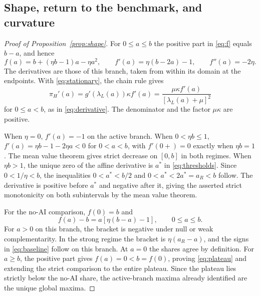 \documentclass[11pt]{article}
\theoremstyle{definition}
\newcommand{\lam}{\lambda_L}
\newcommand{\share}{\pi_H}
\newcommand{\peak}{a^*}
\newcommand{\ret}{a_R}
\begin{document}
\subsection{Shape, return to the benchmark, and curvature}\label{app:shape}
\begin{proof}[Proof of Proposition~\ref{prop:shape}]
For $0\leq a\leq b$ the positive part in \eqref{eq:f} equals $b-a$, and
hence
\begin{equation}\label{eq:quadratic}
 f(a)=b+(\eta b-1)a-\eta a^2,\qquad
 f'(a)=\eta(b-2a)-1,\qquad f''(a)=-2\eta .
\end{equation}
The derivatives are those of this branch, taken from within its domain
at the endpoints. With \eqref{eq:stationary}, the chain rule gives
\[
 \share'(a)=g'(\lam(a))\kappa f'(a)
           =\frac{\mu\kappa f'(a)}{[\lam(a)+\mu]^2}
\]
for $0\leq a<b$, as in \eqref{eq:derivative}. The denominator and the
factor $\mu\kappa$ are positive.

When $\eta=0$, $f'(a)=-1$ on the active branch. When $0<\eta b\leq1$,
$f'(a)=\eta b-1-2\eta a<0$ for $0<a<b$, with
$f'(0+)=0$ exactly when $\eta b=1$. The mean value theorem gives strict
decrease on $[0,b]$ in both regimes. When $\eta b>1$, the unique zero
of the affine derivative is $\peak$ in \eqref{eq:thresholds}. Since
$0<1/\eta<b$, the inequalities $0<\peak<b/2$ and
$0<\peak<2\peak=\ret<b$ follow. The derivative is positive before
$\peak$ and negative after it, giving the asserted strict monotonicity
on both subintervals by the mean value theorem.

For the no-AI comparison, $f(0)=b$ and
\begin{equation}\label{eq:baseline-factor}
 f(a)-b=a[\eta(b-a)-1],\qquad 0\leq a\leq b .
\end{equation}
For $a>0$ on this branch, the bracket is negative under null or weak
complementarity. In the strong regime the bracket is $\eta(\ret-a)$,
and the signs in \eqref{eq:baseline} follow on this branch. At $a=0$
the shares agree by definition. For $a\geq b$, the positive part
gives $f(a)=0<b=f(0)$, proving \eqref{eq:plateau} and extending the
strict comparison to the entire plateau. Since the plateau lies
strictly below the no-AI share, the active-branch maxima already
identified are the unique global maxima.


\end{proof}
\end{document}
